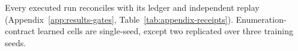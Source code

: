Every executed run reconciles with its ledger and independent replay (Appendix~\ref{app:results-gates}, Table~\ref{tab:appendix-receipts}). Enumeration-contract learned cells are single-seed, except two replicated over three training seeds.
\label{sec:results-gates}
